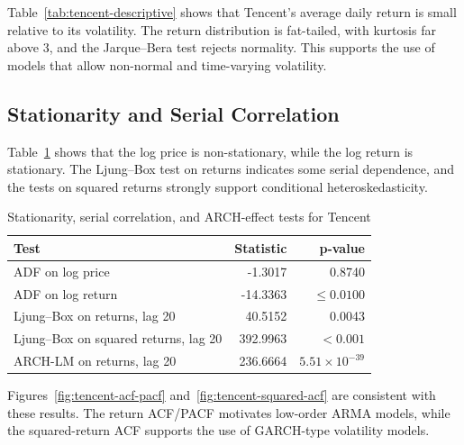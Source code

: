 \documentclass[11pt,a4paper]{article}
\begin{document}
Table~\ref{tab:tencent-descriptive} shows that Tencent's average daily return is small relative to its volatility. The return distribution is fat-tailed, with kurtosis far above 3, and the Jarque--Bera test rejects normality. This supports the use of models that allow non-normal and time-varying volatility.

\begin{table}[H]
\centering
\small
\caption{Descriptive statistics of Tencent daily log returns}
\label{tab:tencent-descriptive}
\end{table}

\subsection{Stationarity and Serial Correlation}

Table~\ref{tab:tencent-tests} shows that the log price is non-stationary, while the log return is stationary. The Ljung--Box test on returns indicates some serial dependence, and the tests on squared returns strongly support conditional heteroskedasticity.

\begin{table}[H]
\centering
\small
\caption{Stationarity, serial correlation, and ARCH-effect tests for Tencent}
\label{tab:tencent-tests}
\begin{tabular}{lrr}
\toprule
Test & Statistic & p-value \\
\midrule
ADF on log price & -1.3017 & 0.8740 \\
ADF on log return & -14.3363 & $\leq 0.0100$ \\
Ljung--Box on returns, lag 20 & 40.5152 & 0.0043 \\
Ljung--Box on squared returns, lag 20 & 392.9963 & $<0.001$ \\
ARCH-LM on returns, lag 20 & 236.6664 & $5.51\times 10^{-39}$ \\
\bottomrule
\end{tabular}
\end{table}

Figures~\ref{fig:tencent-acf-pacf} and~\ref{fig:tencent-squared-acf} are consistent with these results. The return ACF/PACF motivates low-order ARMA models, while the squared-return ACF supports the use of GARCH-type volatility models.
\end{document}

